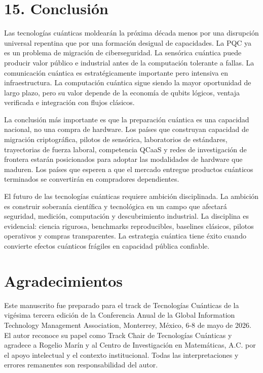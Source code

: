 \documentclass[
  11pt,
  letterpaper,
]{article}
\begin{document}
\section{15. Conclusión}\label{conclusiuxf3n}

Las tecnologías cuánticas moldearán la próxima década menos por una
disrupción universal repentina que por una formación desigual de
capacidades. La PQC ya es un problema de migración de ciberseguridad. La
sensórica cuántica puede producir valor público e industrial antes de la
computación tolerante a fallas. La comunicación cuántica es
estratégicamente importante pero intensiva en infraestructura. La
computación cuántica sigue siendo la mayor oportunidad de largo plazo,
pero su valor depende de la economía de qubits lógicos, ventaja
verificada e integración con flujos clásicos.

La conclusión más importante es que la preparación cuántica es una
capacidad nacional, no una compra de hardware. Los países que construyan
capacidad de migración criptográfica, pilotos de sensórica, laboratorios
de estándares, trayectorias de fuerza laboral, competencia QCaaS y redes
de investigación de frontera estarán posicionados para adoptar las
modalidades de hardware que maduren. Los países que esperen a que el
mercado entregue productos cuánticos terminados se convertirán en
compradores dependientes.

El futuro de las tecnologías cuánticas requiere ambición disciplinada.
La ambición es construir soberanía científica y tecnológica en un campo
que afectará seguridad, medición, computación y descubrimiento
industrial. La disciplina es evidencial: ciencia rigurosa, benchmarks
reproducibles, baselines clásicos, pilotos operativos y compras
transparentes. La estrategia cuántica tiene éxito cuando convierte
efectos cuánticos frágiles en capacidad pública confiable.

\section{Agradecimientos}\label{agradecimientos}

Este manuscrito fue preparado para el track de Tecnologías Cuánticas de
la vigésima tercera edición de la Conferencia Anual de la Global
Information Technology Management Association, Monterrey, México, 6-8 de
mayo de 2026. El autor reconoce su papel como Track Chair de Tecnologías
Cuánticas y agradece a Rogelio Marín y al Centro de Investigación en
Matemáticas, A.C. por el apoyo intelectual y el contexto institucional.
Todas las interpretaciones y errores remanentes son responsabilidad del
autor.
\end{document}
